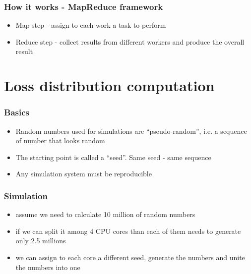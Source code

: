 \documentclass[bigger]{beamer}
\begin{document}
\begin{frame}
\frametitle{How it works - MapReduce framework}
\label{sec-1-3}
\begin{itemize}

\item Map step - assign to each work a task to perform
\label{sec-1-3-1}%

\item Reduce step - collect results from different workers and produce the overall result
\label{sec-1-3-2}%
\end{itemize} %
\end{frame}
\section{Loss distribution computation}
\label{sec-2}
\begin{frame}
\frametitle{Basics}
\label{sec-2-1}
\begin{itemize}

\item Random numbers used for simulations are ``pseudo-random'', i.e. a sequence of number that looks random
\label{sec-2-1-1}%

\item The starting point is called a ``seed''. Same seed - same sequence
\label{sec-2-1-2}%

\item Any simulation system must be reproducible
\label{sec-2-1-3}%
\end{itemize} %
\end{frame}
\begin{frame}
\frametitle{Simulation}
\label{sec-2-2}
\begin{itemize}

\item assume we need to calculate 10 million of random numbers
\label{sec-2-2-1}%

\item if we can split it among 4 CPU cores than each of them needs to generate only 2.5 millions
\label{sec-2-2-2}%

\item we can assign to each core a different seed, generate the numbers and unite the numbers into one
\label{sec-2-2-3}%
\end{itemize} %
\end{frame}
\end{document}
